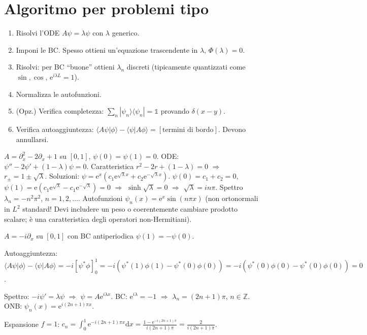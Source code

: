 \documentclass[11pt,a4paper,openany]{book}
\theoremstyle{definition}
\newcommand{\Z}{\mathbb{Z}}
\newcommand{\ket}[1]{|#1\rangle}
\newcommand{\bra}[1]{\langle#1|}
\newcommand{\braket}[2]{\langle#1|#2\rangle}
\newcommand{\dd}{\mathrm{d}}
\newcommand{\eu}{\mathrm{e}}
\begin{document}
\section{Algoritmo per problemi tipo}

\begin{algoritmo}
\begin{enumerate}
\item Risolvi l'ODE $A\psi=\lambda\psi$ con $\lambda$ generico.
\item Imponi le BC. Spesso ottieni un'equazione trascendente in $\lambda$, $\Phi(\lambda)=0$.
\item Risolvi: per BC ``buone'' ottieni $\lambda_n$ discreti (tipicamente quantizzati come $\sin,\cos$, $\eu^{i\lambda L}=1$).
\item Normalizza le autofunzioni.
\item (Opz.) Verifica completezza: $\sum_n\ket{\psi_n}\bra{\psi_n}=\mathbb 1$ provando $\delta(x-y)$.
\item Verifica autoaggiuntezza: $\braket{A\psi}{\phi}-\braket{\psi}{A\phi}=[\text{termini di bordo}]$. Devono annullarsi.
\end{enumerate}
\end{algoritmo}

\begin{esempio}[Scritto 20/06/2023, Es. 3]
$A=\partial_x^2-2\partial_x+1$ su $[0,1]$, $\psi(0)=\psi(1)=0$. ODE: $\psi''-2\psi'+(1-\lambda)\psi=0$. Caratteristica $r^2-2r+(1-\lambda)=0$ $\Rightarrow$ $r_\pm=1\pm\sqrt\lambda$. Soluzioni: $\psi=\eu^x(c_1\eu^{\sqrt\lambda x}+c_2\eu^{-\sqrt\lambda x})$. $\psi(0)=c_1+c_2=0$, $\psi(1)=\eu(c_1\eu^{\sqrt\lambda}-c_1\eu^{-\sqrt\lambda})=0$ $\Rightarrow$ $\sinh\sqrt\lambda=0$ $\Rightarrow$ $\sqrt\lambda=i n\pi$. Spettro $\lambda_n=-n^2\pi^2$, $n=1,2,\dots$. Autofunzioni $\psi_n(x)=\eu^x\sin(n\pi x)$ (non ortonormali in $L^2$ standard! Devi includere un peso o coerentemente cambiare prodotto scalare; \`e una caratteristica degli operatori non-Hermitiani).
\end{esempio}

\begin{esempio}[Scritto 08/07/2025, Es. 3]
$A=-i\partial_x$ su $[0,1]$ con BC antiperiodica $\psi(1)=-\psi(0)$.

Autoaggiuntezza: $\braket{A\psi}{\phi}-\braket{\psi}{A\phi}=-i[\psi^*\phi]_0^1=-i(\psi^*(1)\phi(1)-\psi^*(0)\phi(0))=-i(\psi^*(0)\phi(0)-\psi^*(0)\phi(0))=0$. \checkmark

Spettro: $-i\psi'=\lambda\psi$ $\Rightarrow$ $\psi=A\eu^{i\lambda x}$. BC: $\eu^{i\lambda}=-1$ $\Rightarrow$ $\lambda_n=(2n+1)\pi$, $n\in\Z$. ONB: $\psi_n(x)=\eu^{i(2n+1)\pi x}$.

Espansione $f=1$: $c_n=\int_0^1\eu^{-i(2n+1)\pi x}\dd x=\frac{1-\eu^{-i(2n+1)\pi}}{i(2n+1)\pi}=\frac{2}{i(2n+1)\pi}$.
\end{esempio}
\end{document}
